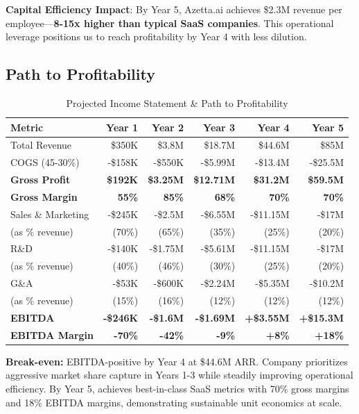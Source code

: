 \textbf{Capital Efficiency Impact}: By Year 5, Azetta.ai achieves \$2.3M revenue per employee—\textbf{8-15x higher than typical SaaS companies}. This operational leverage positions us to reach profitability by Year 4 with less dilution.

\subsection{Path to Profitability}

\begin{table}[ht]
\centering
\small
\begin{tabular}{|l|r|r|r|r|r|}
\hline
\textbf{Metric} & \textbf{Year 1} & \textbf{Year 2} & \textbf{Year 3} & \textbf{Year 4} & \textbf{Year 5} \\
\hline
Total Revenue & \$350K & \$3.8M & \$18.7M & \$44.6M & \$85M \\
COGS (45-30\%) & -\$158K & -\$550K & -\$5.99M & -\$13.4M & -\$25.5M \\
\hline
\textbf{Gross Profit} & \textbf{\$192K} & \textbf{\$3.25M} & \textbf{\$12.71M} & \textbf{\$31.2M} & \textbf{\$59.5M} \\
\textbf{Gross Margin} & \textbf{55\%} & \textbf{85\%} & \textbf{68\%} & \textbf{70\%} & \textbf{70\%} \\
\hline
\hline
Sales \& Marketing & -\$245K & -\$2.5M & -\$6.55M & -\$11.15M & -\$17M \\
(as \% revenue) & (70\%) & (65\%) & (35\%) & (25\%) & (20\%) \\
\hline
R\&D & -\$140K & -\$1.75M & -\$5.61M & -\$11.15M & -\$17M \\
(as \% revenue) & (40\%) & (46\%) & (30\%) & (25\%) & (20\%) \\
\hline
G\&A & -\$53K & -\$600K & -\$2.24M & -\$5.35M & -\$10.2M \\
(as \% revenue) & (15\%) & (16\%) & (12\%) & (12\%) & (12\%) \\
\hline
\hline
\textbf{EBITDA} & \textbf{-\$246K} & \textbf{-\$1.6M} & \textbf{-\$1.69M} & \textbf{+\$3.55M} & \textbf{+\$15.3M} \\
\textbf{EBITDA Margin} & \textbf{-70\%} & \textbf{-42\%} & \textbf{-9\%} & \textbf{+8\%} & \textbf{+18\%} \\
\hline
\end{tabular}
\caption{Projected Income Statement \& Path to Profitability}
\end{table}

\textbf{Break-even:} EBITDA-positive by Year 4 at \$44.6M ARR. Company prioritizes aggressive market share capture in Years 1-3 while steadily improving operational efficiency. By Year 5, achieves best-in-class SaaS metrics with 70\% gross margins and 18\% EBITDA margins, demonstrating sustainable unit economics at scale.

